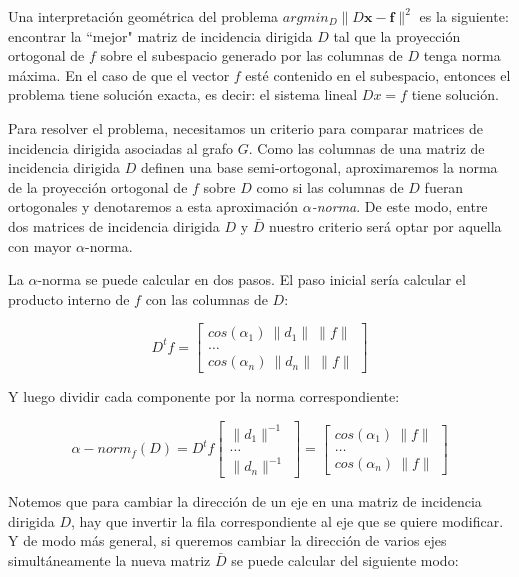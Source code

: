 \documentclass[conference,compsoc,a4paper]{IEEEtran}
\begin{document}
Una interpretación geométrica del problema $argmin_D\|D \bm x- \bm f
\|^2$ es la siguiente: encontrar la ``mejor" matriz de incidencia 
dirigida $D$ tal que la proyección ortogonal de $f$ sobre el subespacio 
generado por las columnas de $D$ tenga norma máxima. En el caso de que 
el vector $f$ esté contenido en el subespacio, entonces el problema 
tiene solución exacta, es decir: el sistema lineal $Dx = f$ tiene 
solución.

\smallskip

Para resolver el problema, necesitamos un criterio para comparar  
matrices de incidencia dirigida asociadas al grafo $G$. Como las 
columnas de una matriz de incidencia dirigida $D$ definen una base 
semi-ortogonal, aproximaremos la norma de la proyección 
ortogonal de $f$ sobre $D$ como si las columnas de $D$ fueran 
ortogonales y denotaremos a esta aproximación \textit{$\alpha$-norma}.
 De este modo, entre dos matrices de incidencia dirigida $D$ y 
 $\bar{D}$ nuestro criterio será optar por aquella con mayor 
 $\alpha$-norma. 

\smallskip

La $\alpha$-norma se puede calcular en dos pasos. El paso inicial sería 
calcular el producto interno de $f$ con las columnas de $D$:

$$
D^t f = \begin{bmatrix}
	cos(\alpha_1) \ \|d_1\| \ \|f\|\\
	\dots \\
	cos(\alpha_n) \ \|d_n\| \ \|f\|
\end{bmatrix}
$$

\smallskip

Y luego dividir cada componente por la norma correspondiente:

$$
\alpha-norm_f(D) = D^t f
\begin{bmatrix}
	\|d_1\|^{-1}\\
	\dots \\
	\|d_n\|^{-1}
\end{bmatrix} = \begin{bmatrix}
	cos(\alpha_1) \ \|f\|\\
	\dots \\
	cos(\alpha_n) \ \|f\|
\end{bmatrix}
$$

\smallskip

Notemos que para cambiar la dirección de un eje en una matriz de 
incidencia dirigida $D$, hay que invertir la fila correspondiente al 
eje que se quiere modificar. Y de modo más general, si queremos cambiar 
la dirección de varios ejes simultáneamente la nueva matriz $\bar{D}$
se puede calcular del siguiente modo:
\end{document}
